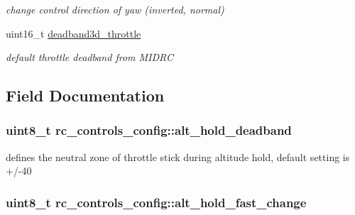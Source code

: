 \begin{DoxyCompactItemize}
\begin{DoxyCompactList}\small\item\em change control direction of yaw (inverted, normal) \end{DoxyCompactList}\item 
uint16\+\_\+t \hyperlink{structrc__controls__config_a80d412104d96ef30ed53c042f153da6b}{deadband3d\+\_\+throttle}
\begin{DoxyCompactList}\small\item\em default throttle deadband from M\+I\+D\+R\+C \end{DoxyCompactList}\end{DoxyCompactItemize}


\subsection{Field Documentation}
\hypertarget{structrc__controls__config_ad837982fca562e3da75a4edf3af3a193}{
\subsubsection[{alt\+\_\+hold\+\_\+deadband}]{\setlength{\rightskip}{0pt plus 5cm}uint8\+\_\+t rc\+\_\+controls\+\_\+config\+::alt\+\_\+hold\+\_\+deadband}}\label{structrc__controls__config_ad837982fca562e3da75a4edf3af3a193}


defines the neutral zone of throttle stick during altitude hold, default setting is +/-\/40 

\hypertarget{structrc__controls__config_aacfb7556a9db4d96e4b6e8b008aa4bef}{
\subsubsection[{alt\+\_\+hold\+\_\+fast\+\_\+change}]{\setlength{\rightskip}{0pt plus 5cm}uint8\+\_\+t rc\+\_\+controls\+\_\+config\+::alt\+\_\+hold\+\_\+fast\+\_\+change}}\label{structrc__controls__config_aacfb7556a9db4d96e4b6e8b008aa4bef}



